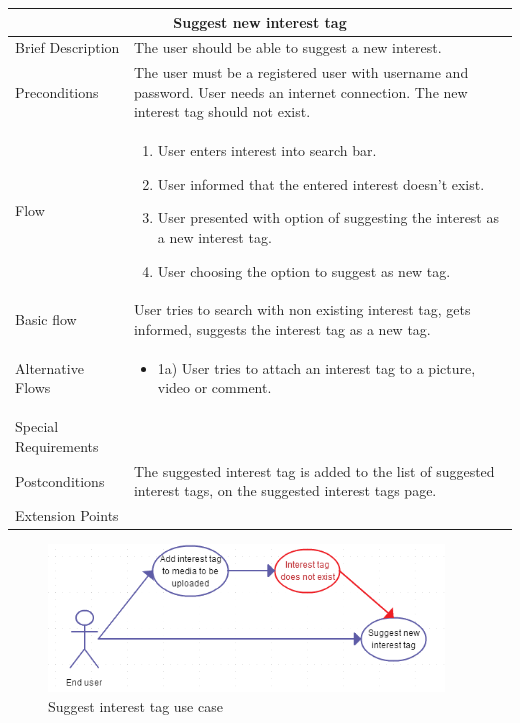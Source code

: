 \begin{minipage}{\linewidth}
\begin{tabular}{|l|p{85mm}|}
  \hline
  \multicolumn{2}{|c|}{\cellcolor{gray!25} \textbf{Suggest new interest tag}} \\
  \hline
  Brief Description & The user should be able to suggest a new interest.\\
  Preconditions & The user must be a registered user with username and password. User needs an internet connection. The new interest tag should not exist.\\
  Flow &
    \begin{enumerate}
      \item User enters interest into search bar.
      \item User informed that the entered interest doesn’t exist.
      \item User presented with option of suggesting the interest as a new interest tag.
      \item User choosing the option to suggest as new tag.
    \end{enumerate} \\
  Basic flow & User tries to search with non existing interest tag, gets informed, suggests the interest tag as a new tag.\\
  Alternative Flows & 
    \begin{itemize}
      \item 1a) User tries to attach an interest tag to a picture, video or comment.
    \end{itemize} \\
  Special Requirements & \\
  Postconditions & The suggested interest tag is added to the list of suggested interest tags, on the suggested interest tags page.\\
  Extension Points & \\
  \hline
\end{tabular}
\end{minipage}

\begin{figure}[ht!]
\centering
\includegraphics[width=105mm]{./SystemRequirements/img/suggesttagUC.png}
\caption{Suggest interest tag use case \label{fig:SysReqUseCasesSuggestTag}}
\end{figure}

